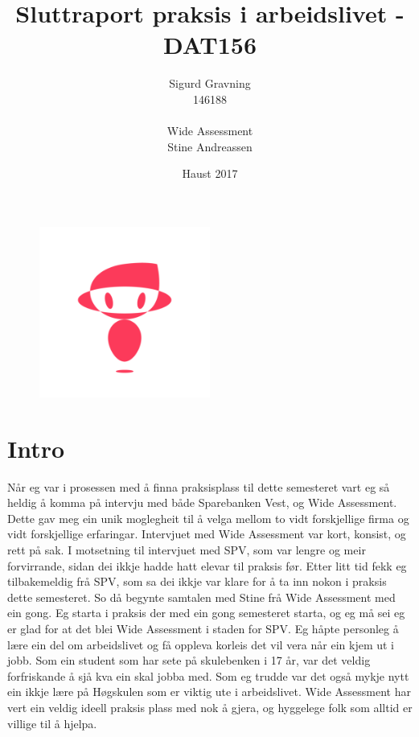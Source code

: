 \documentclass[12pt]{article}
\title{Sluttraport praksis i arbeidslivet - DAT156}
\date{Haust 2017}
\author{Sigurd Gravning \\146188 \\ \\Wide Assessment \\Stine Andreassen}
\begin{document}
\maketitle

\begin{figure}[!h]
  \includegraphics[width=0.5\textwidth]{WA}
  \centering
\end{figure}

\newpage
{}
\tableofcontents
\newpage

\section{Intro}

Når eg var i prosessen med å finna praksisplass til dette semesteret vart eg så
heldig å komma på intervju med både Sparebanken Vest, og Wide Assessment.
Dette gav meg ein unik moglegheit til å velga mellom to vidt forskjellige firma
og vidt forskjellige erfaringar. Intervjuet med Wide Assessment var kort, konsist,
og rett på sak. I motsetning til intervjuet med SPV, som var lengre og meir forvirrande,
sidan dei ikkje hadde hatt elevar til praksis før. Etter litt tid fekk eg
tilbakemeldig frå SPV, som sa dei ikkje var klare for å ta inn nokon i praksis
dette semesteret. So då begynte samtalen med Stine frå Wide Assessment med ein gong.
Eg starta  i praksis der med ein gong semesteret starta, og eg må sei eg er glad
for at det blei Wide Assessment i staden for SPV. Eg håpte personleg å lære ein
del om arbeidslivet og få oppleva korleis det vil vera når ein kjem ut i jobb.
Som ein student som har sete på skulebenken i 17 år, var det veldig forfriskande
å sjå kva ein skal jobba med. Som eg trudde var det også mykje nytt ein ikkje
lære på Høgskulen som er viktig ute i arbeidslivet. Wide Assessment har vert
ein veldig ideell praksis plass med nok å gjera, og hyggelege folk som alltid
er villige til å hjelpa.
\end{document}
